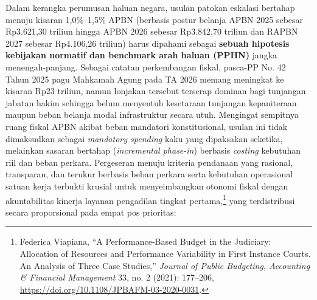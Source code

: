\documentclass[12pt,a4paper,twocolumn]{article}
\begin{document}
Dalam kerangka perumusan haluan negara, usulan patokan eskalasi bertahap menuju kisaran 1,0\%--1,5\% APBN (berbasis postur belanja APBN 2025 sebesar Rp3.621,30 triliun hingga APBN 2026 sebesar Rp3.842,70 triliun dan RAPBN 2027 sebesar Rp4.106,26 triliun) harus dipahami sebagai \textbf{sebuah hipotesis kebijakan normatif dan benchmark arah haluan (PPHN)} jangka menengah-panjang. Sebagai catatan perkembangan fiskal, pasca-PP No. 42 Tahun 2025 pagu Mahkamah Agung pada TA 2026 memang meningkat ke kisaran Rp23 triliun, namun lonjakan tersebut terserap dominan bagi tunjangan jabatan hakim sehingga belum menyentuh kesetaraan tunjangan kepaniteraan maupun beban belanja modal infrastruktur secara utuh. Mengingat sempitnya ruang fiskal APBN akibat beban mandatori konstitusional, usulan ini tidak dimaksudkan sebagai \textit{mandatory spending} kaku yang dipaksakan seketika, melainkan sasaran bertahap (\textit{incremental phase-in}) berbasis \textit{costing} kebutuhan riil dan beban perkara. Pergeseran menuju kriteria pendanaan yang rasional, transparan, dan terukur berbasis beban perkara serta kebutuhan operasional satuan kerja terbukti krusial untuk menyeimbangkan otonomi fiskal dengan akuntabilitas kinerja layanan pengadilan tingkat pertama,\footnote{Federica Viapiana, ``A Performance-Based Budget in the Judiciary: Allocation of Resources and Performance Variability in First Instance Courts. An Analysis of Three Case Studies,'' \textit{Journal of Public Budgeting, Accounting \& Financial Management} 33, no. 2 (2021): 177--206, \url{https://doi.org/10.1108/JPBAFM-03-2020-0031}.} yang terdistribusi secara proporsional pada empat pos prioritas:
\end{document}
